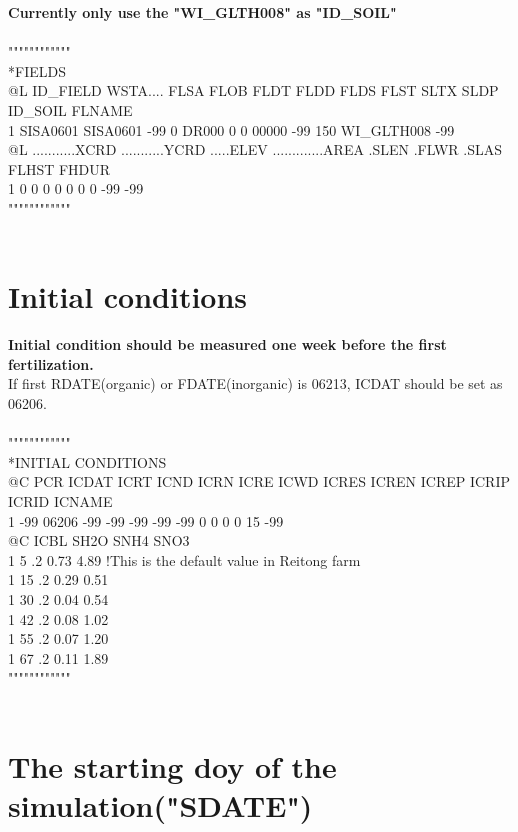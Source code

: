 \documentclass[11pt,a4j]{jarticle}
\begin{document}
{\bf Currently only use the "WI\_GLTH008" as "ID\_SOIL"}\\
\\
""""""""""""\\
*FIELDS\\
@L ID\_FIELD WSTA....  FLSA  FLOB  FLDT  FLDD  FLDS  FLST SLTX  SLDP  ID\_SOIL    FLNAME\\
 1 SISA0601 SISA0601   -99     0 DR000     0     0 00000 -99    150  WI\_GLTH008 -99\\
@L ...........XCRD ...........YCRD .....ELEV .............AREA .SLEN .FLWR .SLAS FLHST FHDUR\\
 1               0               0         0                 0     0     0     0   -99   -99\\
""""""""""""\\
\\
  \section{Initial conditions}
  
{\bf Initial condition should be measured one week before the first fertilization.}\\

If first RDATE(organic) or FDATE(inorganic) is 06213, ICDAT should be set as 06206.\\
\\
""""""""""""\\
*INITIAL CONDITIONS\\
@C   PCR ICDAT  ICRT  ICND  ICRN  ICRE  ICWD ICRES ICREN ICREP ICRIP ICRID ICNAME\\
 1   -99 06206   -99   -99   -99   -99   -99     0     0     0     0    15 -99\\
@C  ICBL  SH2O  SNH4  SNO3\\
 1     5    .2  0.73  4.89  !This is the default value in Reitong farm\\
 1    15    .2  0.29  0.51 \\
 1    30    .2  0.04  0.54 \\
 1    42    .2  0.08  1.02 \\
 1    55    .2  0.07  1.20 \\
 1    67    .2  0.11  1.89\\
""""""""""""\\
\\ 
 
  \section{The starting doy of the simulation("SDATE")}
  
\end{document}

